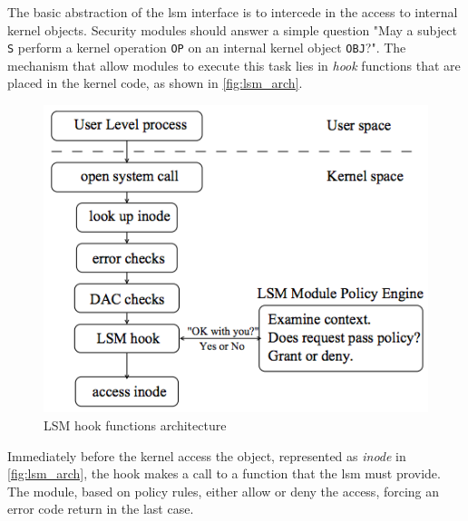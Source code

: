 The basic abstraction of the \gls{lsm} interface is to intercede in the access to internal kernel objects. Security modules should answer a simple question "May a subject \texttt{S} perform a kernel operation \texttt{OP} on an internal kernel object \texttt{OBJ}?". The mechanism that allow modules to execute this task lies in \textit{hook} functions that are placed in the kernel code, as shown in \autoref{fig:lsm_arch}.

\begin{figure}[htbp]
 \centering
 \includegraphics[scale=0.5]{images/LSM_architecture.png}
 \caption{LSM hook functions architecture}
 \label{fig:lsm_arch}
\end{figure}

\noindent
Immediately before the kernel access the object, represented as \textit{inode} in \autoref{fig:lsm_arch}, the hook makes a call to a function that the \gls{lsm} must provide. The module, based on policy rules, either allow or deny the access, forcing an error code return in the last case.
